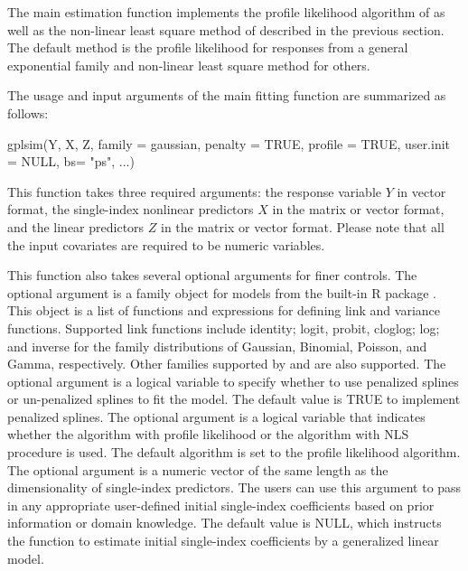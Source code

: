 The main estimation function  implements the profile likelihood algorithm of \cite{yu_penalised_2017} as well as the non-linear least square method of \cite{yu_penalized_2002} described in the previous section. The default method is the profile likelihood for responses from a general exponential family and non-linear least square method for others. 

The usage and input arguments of the main fitting function  are summarized as follows:

\begin{example}
  gplsim(Y, X, Z, family = gaussian, penalty = TRUE, profile = TRUE, user.init = NULL,
   bs= "ps", ...)
\end{example}

This function takes three required arguments: the response variable $Y$ in vector format, the single-index nonlinear predictors $X$ in the matrix or vector format, and the linear predictors $Z$ in the matrix or vector format. Please note that all the input covariates are required to be numeric variables. 

This function also takes several optional arguments for finer controls. The optional argument  is a family object for models from the built-in R package . This object is a list of functions and expressions for defining link and variance functions. Supported link functions include identity; logit, probit, cloglog; log; and inverse for the family distributions of Gaussian, Binomial, Poisson, and Gamma, respectively. Other families supported by  and  are also supported. The optional argument  is a logical variable to specify whether to use penalized splines or un-penalized splines to fit the model. The default value is TRUE to implement penalized splines. The optional argument  is a logical variable that indicates whether the algorithm with profile likelihood or the algorithm with NLS procedure is used. The default algorithm is set to the profile likelihood algorithm. The optional argument  is a numeric vector of the same length as the dimensionality of single-index predictors. The users can use this argument to pass in any appropriate user-defined initial single-index coefficients based on prior information or domain knowledge. The default value is NULL, which instructs the function to estimate initial single-index coefficients by a generalized linear model.



